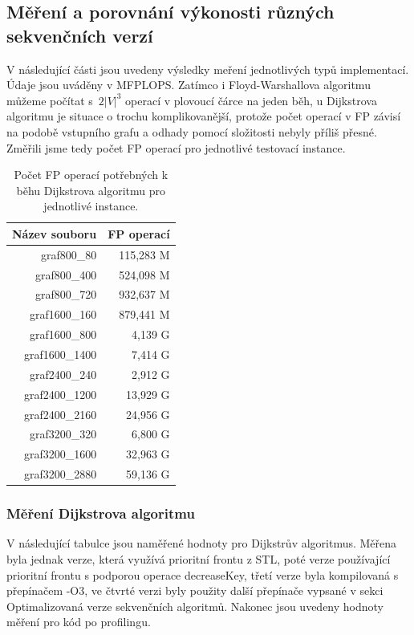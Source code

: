\documentclass[a4paper,11pt]{article}
\begin{document}
\subsection{Měření a porovnání výkonosti různých sekvenčních verzí}
V následující části jsou uvedeny výsledky meření jednotlivých typů implementací. Údaje jsou uváděny v MFPLOPS. Zatímco i Floyd-Warshallova algoritmu můžeme počítat s~$2|V|^3$ operací v plovoucí čárce na jeden běh, u Dijkstrova algoritmu je situace o trochu komplikovanější, protože počet operací v FP závisí na podobě vstupního grafu a odhady pomocí složitosti nebyly příliš přesné. Změřili jsme tedy počet FP operací pro jednotlivé testovací instance.
\begin{table}[H]
  \begin{center}
      \begin{tabular}{|r|r|}
      \hline
      Název souboru 	& FP operací  	\\ \hline
      graf800\_80  	& 115,283 M            		\\ \hline
      graf800\_400     	& 524,098 M    		     	\\ \hline
      graf800\_720  	& 932,637 M    	            	\\ \hline
      graf1600\_160    	& 879,441 M    	        	\\ \hline
      graf1600\_800  	& 4,139 G    	           	\\ \hline
      graf1600\_1400   	& 7,414 G    	         	\\ \hline
      graf2400\_240  	& 2,912 G    	          	\\ \hline
      graf2400\_1200   	& 13,929 G    	         	\\ \hline
      graf2400\_2160  	& 24,956 G    	            	\\ \hline
      graf3200\_320    	& 6,800 G             		\\ \hline
      graf3200\_1600  	& 32,963 G    	            	\\ \hline
      graf3200\_2880   	& 59,136 G    	         	\\ \hline
      \end{tabular}
  \caption{Počet FP operací potřebných k běhu Dijkstrova algoritmu pro jednotlivé instance.}
  \label{tab:fp_operace}
  \end{center}
\end{table}

\subsubsection{Měření Dijkstrova algoritmu}
V následující tabulce jsou naměřené hodnoty pro Dijkstrův algoritmus. Mě\-ře\-na byla jednak verze, která využívá prioritní frontu z STL, poté verze používající prioritní frontu s podporou operace decreaseKey, třetí verze byla kompilovaná s pře\-pí\-načem -O3, ve čtvrté verzi byly použity další pře\-pí\-nače vypsané v sekci Optimalizovaná verze sekvenčních algoritmů. Nakonec jsou uvedeny hodnoty měření pro kód po profilingu.
\par
\end{document}
